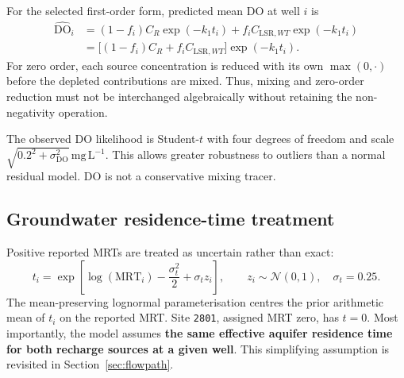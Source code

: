 \documentclass[11pt,a4paper]{article}
\newcommand{\DO}{\mathrm{DO}}
\newcommand{\LSR}{\mathrm{LSR}}
\newcommand{\site}[1]{\texttt{#1}}
\newcommand{\mgL}{\mathrm{mg\,L^{-1}}}
\begin{document}
For the selected first-order form, predicted mean DO at well \(i\) is
\begin{align}
 \widehat{\DO}_i
  &=(1-f_i)C_R\exp(-k_1t_i)
    +f_iC_{\LSR,WT}\exp(-k_1t_i)\\
  &=\big[(1-f_i)C_R+f_iC_{\LSR,WT}\big]\exp(-k_1t_i).
 \label{eq:do}
\end{align}
For zero order, each source concentration is reduced with its own \(\max(0,\cdot)\) before the depleted contributions are mixed. Thus, mixing and zero-order reduction must not be interchanged algebraically without retaining the non-negativity operation.

The observed DO likelihood is Student-\(t\) with four degrees of freedom and scale \(\sqrt{0.2^2+\sigma_{\DO}^2}\,\mgL\). This allows greater robustness to outliers than a normal residual model. DO is not a conservative mixing tracer.

\subsection{Groundwater residence-time treatment}
Positive reported MRTs are treated as uncertain rather than exact:
\begin{equation}
 t_i=\exp\!\left[\log(\mathrm{MRT}_i)-\frac{\sigma_t^2}{2}
 +\sigma_tz_i\right],\qquad z_i\sim\mathcal N(0,1),\quad\sigma_t=0.25.
 \label{eq:mrt}
\end{equation}
The mean-preserving lognormal parameterisation centres the prior arithmetic mean of \(t_i\) on the reported MRT. Site \site{2801}, assigned MRT zero, has \(t=0\). Most importantly, the model assumes \textbf{the same effective aquifer residence time for both recharge sources at a given well}. This simplifying assumption is revisited in Section~\ref{sec:flowpath}.
\end{document}
